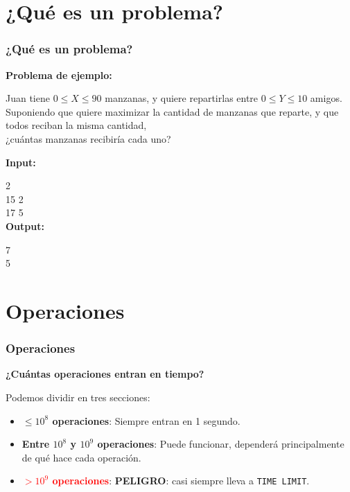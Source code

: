 \documentclass{beamer}
\begin{document}
\section{¿Qué es un problema?}

\begin{frame}
  \frametitle{¿Qué es un problema?}

  \textbf{Problema de ejemplo:}
  
  Juan tiene $0 \leq X \leq 90$ manzanas, y quiere repartirlas entre $0 \leq Y \leq 10$ amigos. \\
  Suponiendo que quiere maximizar la cantidad de manzanas que reparte, y que todos reciban la misma cantidad,\\
  ¿cuántas manzanas recibiría cada uno?

  \textbf{Input:}

  2 \\
  15 2 \\
  17 5 \\

  \textbf{Output:}

  7 \\
  5 \\

\end{frame}


\section{Operaciones}

\begin{frame}
  \frametitle{Operaciones}

  \textbf{¿Cuántas operaciones entran en tiempo?}

  Podemos dividir en tres secciones:
  
  \begin{itemize}
    \item \textcolor{green!60!black}{\textbf{$\leq 10^8$ operaciones}}: Siempre entran en 1 segundo.
    \item \textcolor{orange!90!black}{\textbf{Entre $10^8$ y $10^9$ operaciones}}: Puede funcionar, dependerá principalmente de qué hace cada operación.
    \item \textcolor{red}{\textbf{$> 10^9$ operaciones}}: \textbf{PELIGRO}: casi siempre lleva a \texttt{TIME LIMIT}.
  \end{itemize}

\end{frame}
\end{document}
